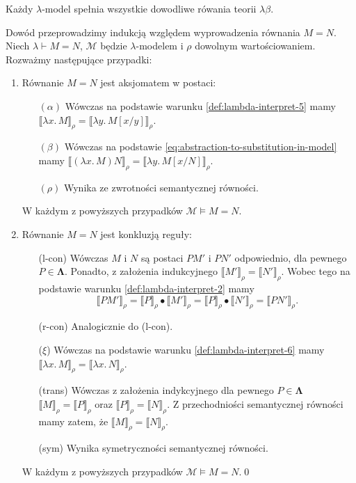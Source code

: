 \begin{twierdzenie}
  Każdy \(\lambda\)-model spełnia wszystkie dowodliwe rówania teorii \(\lambda\beta\).
\end{twierdzenie}
\begin{dowod}
  Dowód przeprowadzimy indukcją względem wyprowadzenia równania \(M=N\).
  Niech \(\lambda \vdash M=N\), \(\mathcal{M}\) będzie \(\lambda\)-modelem i \(\rho\) dowolnym wartościowaniem.
  Rozważmy następujące przypadki:
  \begin{enumerate}
    \setlength\itemsep{0em}
    \item Równanie \(M=N\) jest aksjomatem w postaci:  
      \begin{enumerate}
      \setlength\itemsep{0em}
        \item[\((\alpha)\)] Wówczas na podstawie warunku \ref{def:lambda-interpret-5} mamy
      \(\llbracket\lambda x.\,M\rrbracket_\rho = \llbracket \lambda y.\,M[x/y]\rrbracket_\rho\). 
        \item[\((\beta)\)] Wówczas na podstawie \eqref{eq:abstraction-to-substitution-in-model} mamy
          \(\llbracket(\lambda x.\,M)N\rrbracket_\rho = \llbracket \lambda y.\,M[x/N]\rrbracket_\rho\).
       \item[\((\rho)\)] Wynika ze zwrotności semantycznej równości.
      \end{enumerate}    
      W każdym z powyższych przypadków \(\mathcal{M}\models M=N\).
    \item Równanie \(M=N\) jest konkluzją reguły:
      \begin{enumerate}
      \setlength\itemsep{0em}
        \item[(l-con)] Wówczas \(M\) i \(N\) są postaci \(PM'\) i \(PN'\) odpowiednio, dla pewnego \(P\in\mathbf{\Lambda}\).
          Ponadto, z założenia indukcyjnego \(\llbracket M' \rrbracket_\rho=\llbracket N' \rrbracket_\rho\).
          Wobec tego na podstawie warunku \ref{def:lambda-interpret-2} mamy
          \[\llbracket PM'\rrbracket_\rho  =
            \llbracket P\rrbracket_\rho \bullet \llbracket M'\rrbracket_\rho =
            \llbracket P\rrbracket_\rho \bullet \llbracket N'\rrbracket_\rho =
            \llbracket PN'\rrbracket_\rho.\]
        \item[(r-con)] Analogicznie do (l-con).
        \item[(\(\xi\))] Wówczas na podstawie warunku \ref{def:lambda-interpret-6} mamy
          \(\llbracket \lambda x.\,M \rrbracket_\rho=\llbracket \lambda x.\,N\rrbracket_\rho\).
        \item[(trans)]
          Wówczas z założenia indykcyjnego dla pewnego \(P\in\mathbf{\Lambda}\)
          \(\llbracket M \rrbracket_\rho = \llbracket P \rrbracket_\rho\) oraz
          \(\llbracket P \rrbracket_\rho=\llbracket N \rrbracket_\rho\).
          Z przechodniości semantycznej równości mamy zatem, że \( \llbracket M \rrbracket_\rho=\llbracket N \rrbracket_\rho\).
        \item[(sym)] Wynika symetryczności semantycznej równości.
      \end{enumerate}
    W każdym z powyższych przypadków \(\mathcal{M}\models M=N\).\qed
  \end{enumerate}
\end{dowod}
  
